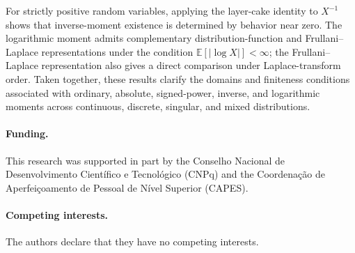 \documentclass[11pt]{article}
\theoremstyle{definition}
\theoremstyle{remark}
\newcommand{\E}{\mathbb{E}}
\newcommand{\abs}[1]{\left\lvert #1\right\rvert}
\begin{document}
For strictly positive random variables, applying the layer-cake identity to
$X^{-1}$ shows that inverse-moment existence is determined by behavior near
zero.  The logarithmic moment admits complementary distribution-function and
Frullani--Laplace representations under the condition
$\E[\abs{\log X}]<\infty$; the Frullani--Laplace representation also gives a
direct comparison under Laplace-transform order.  Taken together, these
results clarify the domains and finiteness conditions associated with
ordinary, absolute, signed-power, inverse, and logarithmic moments across
continuous, discrete, singular, and mixed distributions.

\paragraph{Funding.}
This research was supported in part by the Conselho Nacional de
Desenvolvimento Cient\'ifico e Tecnol\'ogico (CNPq) and the Coordena\c{c}\~ao
de Aperfei\c{c}oamento de Pessoal de N\'ivel Superior (CAPES).

\paragraph{Competing interests.}
The authors declare that they have no competing interests.
\end{document}
